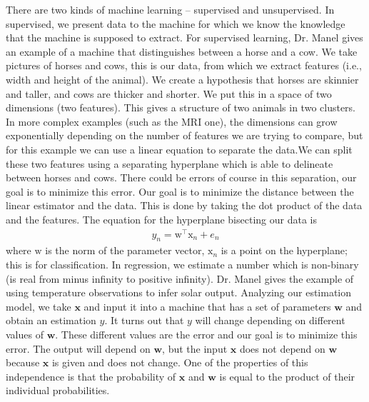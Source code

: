 \documentclass[11pt]{article}
\begin{document}
There are two kinds of machine learning -- supervised and unsupervised. In supervised, we present data to the machine for which we know the knowledge that the machine is supposed to extract. For supervised learning, Dr. Manel gives an example of a machine that distinguishes between a horse and a cow. We take pictures of horses and cows, this is our data, from which we extract features (i.e., width and height of the animal). We create a hypothesis that horses are skinnier and taller, and cows are thicker and shorter. We put this in a space of two dimensions (two features). This gives a structure of two animals in two clusters. In more complex examples (such as the MRI one), the dimensions can grow exponentially depending on the number of features we are trying to compare, but for this example we can use a linear equation to separate the data.We can split these two features using a separating hyperplane which is able to delineate between horses and cows. There could be errors of course in this separation, our goal is to minimize this error. Our goal is to minimize the distance between the linear estimator and the data. This is done by taking the dot product of the data and the features. The equation for the hyperplane bisecting our data is
\begin{align}
	y_n = \bm{\mathrm{w^\top x}}_{n}+e_n
\end{align}
where \( \bm{\mathrm{w}} \) is the norm of the parameter vector, \(\bm{\mathrm{x}}_{n}\) is a point on the hyperplane; this is for classification. In regression, we estimate a number which is non-binary (is real from minus infinity to positive infinity). Dr. Manel gives the example of using temperature observations to infer solar output. Analyzing our estimation model, we take \(\mathbf{x}\) and input it into a machine that has a set of parameters \(\mathbf{w}\) and obtain an estimation \(y\). It turns out that \(y\) will change depending on different values of \(\mathbf{w}\). These different values are the error and our goal is to minimize this error. The output will depend on \(\mathbf{w}\), but the input \(\mathbf{x}\) does not depend on \(\mathbf{w}\) because \(\mathbf{x}\) is given and does not change. One of the properties of this independence is that the probability of \(\mathbf{x}\) and \(\mathbf{w}\) is equal to the product of their individual probabilities.
\end{document}
